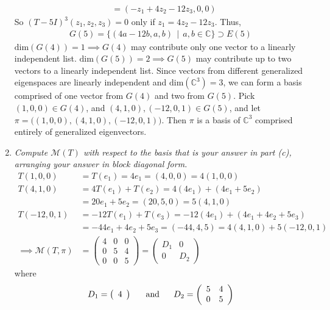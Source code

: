 \documentclass[12pt]{article}
\newcommand{\suchthat}{\, \mid \,}
\begin{document}
\begin{enumerate}[\ \ \it(a)\ \ ]
\begin{align*}
		&= (-z_1 + 4z_2 -12z_3, 0, 0)
	\end{align*}
	So $(T - 5I)^3(z_1, z_2, z_3) = 0$ only if $z_1 = 4z_2 - 12z_3$.  Thus,
	\begin{align*}
		G(5) = \{(4a - 12b, a, b) \suchthat a,b \in \mathbb{C}\} \supset E(5)
	\end{align*}
	$\text{dim}(G(4)) = 1 \implies G(4)$ may contribute only one vector to a linearly independent list.  $\text{dim}(G(5)) = 2 \implies G(5)$ may contribute up to two vectors to a linearly independent list.  Since vectors from different generalized eigenspaces are linearly independent and $\text{dim}(\mathbb{C}^3) = 3$, we can form a basis comprised of one vector from $G(4)$ and two from $G(5)$.  Pick $(1, 0, 0) \in G(4)$, and $(4, 1, 0), (-12, 0, 1) \in G(5)$, and let $\pi = \Big((1, 0, 0), (4, 1, 0), (-12, 0, 1)\Big)$.  Then $\pi$ is a basis of $\mathbb{C}^3$ comprised entirely of generalized eigenvectors.
	\item {\it Compute $\mathcal{M}(T)$ with respect to the basis that is your answer in part (c), arranging your answer in block diagonal form.}
	\begin{align*}
		T(1, 0, 0) &= T(e_1) = 4e_1 = (4, 0, 0) = 4(1, 0, 0) \\
		T(4, 1, 0) &= 4T(e_1) + T(e_2) = 4(4e_1) + (4e_1 + 5e_2) \\
		&= 20e_1 + 5e_2 = (20, 5, 0) = 5(4, 1, 0) \\
		T(-12, 0, 1) &= -12T(e_1) + T(e_3) = -12(4e_1) + (4e_1 + 4e_2 + 5e_3) \\
		&= -44e_1 + 4e_2 + 5e_3 = (-44, 4, 5) = 4(4, 1, 0) + 5(-12, 0, 1) \\
		\implies \mathcal{M}(T, \pi) &= \left(\begin{array}{ccc}
			4 & 0 & 0 \\
			0 & 5 & 4 \\
			0 & 0 & 5
		\end{array}\right) = \left(\begin{array}{cc}
			D_1 & 0 \\
			0 & D_2
		\end{array}\right)
	\end{align*}
	where
	\begin{align*}
		D_1 = \left(\begin{array}{c}
			4
		\end{array}\right) \ \ \ \ \ \text{and} \ \ \ \ \ \hfill D_2 = \left(\begin{array}{cc}
			5 & 4 \\
			0 & 5
		\end{array}\right)
	\end{align*}
\end{enumerate}
\end{document}
